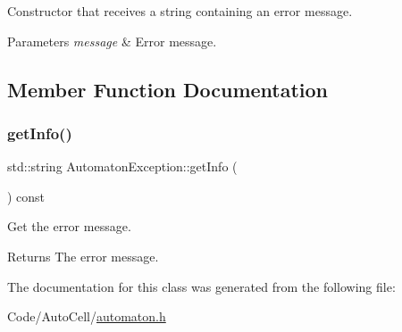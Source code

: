 Constructor that receives a string containing an error message.


\begin{DoxyParams}{Parameters}
{\em message} & Error message. \\
\hline
\end{DoxyParams}


\subsection{Member Function Documentation}
\mbox{\label{class_automaton_exception_a8f72ab5625f64cde775caba3eef5b932}} 
\subsubsection{\texorpdfstring{get\+Info()}{getInfo()}}
{\footnotesize\ttfamily std\+::string Automaton\+Exception\+::get\+Info (\begin{DoxyParamCaption}{ }\end{DoxyParamCaption}) const\hspace{0.3cm}{\ttfamily [inline]}}

Get the error message.

\begin{DoxyReturn}{Returns}
The error message. 
\end{DoxyReturn}


The documentation for this class was generated from the following file\+:\begin{DoxyCompactItemize}
\item 
Code/\+Auto\+Cell/\mbox{\hyperlink{automaton_8h}{automaton.\+h}}\end{DoxyCompactItemize}
